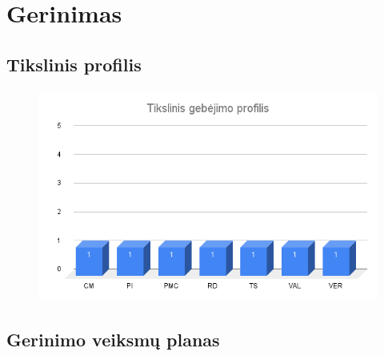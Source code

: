 
\section{Gerinimas}
\subsection{Tikslinis profilis}
\begin{figure}[h]
    \centering
    \includegraphics[width=0.75\linewidth]{gerinimas//img/tikslinis.png}
\end{figure}
\subsection{Gerinimo veiksmų planas}







